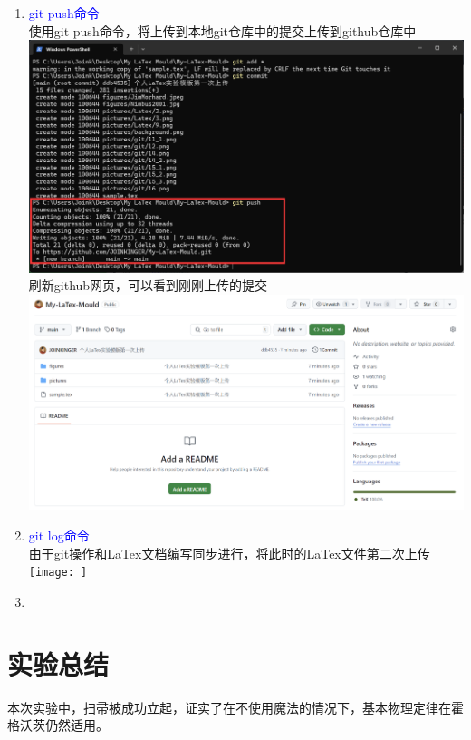 \documentclass[12pt,a4paper,UTF8]{article}
\begin{document}
\begin{enumerate}
        \item \textcolor{blue}{git push命令}\\
        使用git push命令，将上传到本地git仓库中的提交上传到github仓库中\\[6pt]
        \includegraphics[scale=0.25]{pictures/git/19_1.png}\\
        刷新github网页，可以看到刚刚上传的提交\\[6pt]
        \includegraphics[scale=0.25]{pictures/git/19_2.png}    
        
        \item \textcolor{blue}{git log命令}\\
        由于git操作和LaTex文档编写同步进行，将此时的LaTex文件第二次上传\\[6pt]
        \texttt{[image: ]}
        
        \item \textcolor{blue}{}\\
    \end{enumerate}

    \section{实验总结}
    本次实验中，扫帚被成功立起，证实了在不使用魔法的情况下，基本物理定律在霍格沃茨仍然适用。
\end{document}
